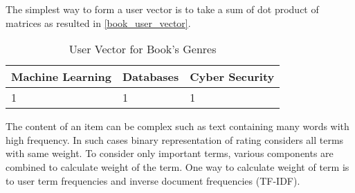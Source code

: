 \noindent The simplest way to form a user vector is to take a sum of dot product of matrices as resulted in \autoref{book_user_vector}.  
\begin{table}[]
\centering
\begin{tabular}{|l|l|l|}
\hline
Machine Learning & Databases & Cyber Security \\ \hline
1                & 1         & 1              \\ \hline
\end{tabular}
\caption{User Vector for Book's Genres}
\label{book_user_vector}
\end{table}

\noindent The content of an item can be complex such as text containing many words with high frequency. In such cases binary representation of rating considers all terms with same weight. To consider only important terms, various components are combined to calculate weight of the term. One way to calculate weight of term is to user term frequencies and inverse document frequencies (TF-IDF). 


